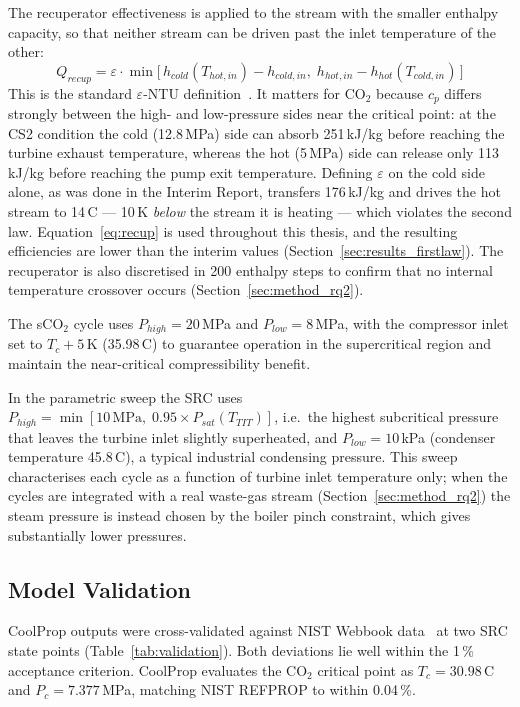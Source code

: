 \documentclass[12pt,a4paper]{report}
\begin{document}
\label{sec:method_recup}
The recuperator effectiveness is applied to the stream with the smaller
enthalpy capacity, so that neither stream can be driven past the inlet
temperature of the other:
\begin{equation}
Q_{recup} = \varepsilon \cdot \min\!\big[\,h_{cold}(T_{hot,in}) - h_{cold,in},\;
h_{hot,in} - h_{hot}(T_{cold,in})\,\big]
\label{eq:recup}
\end{equation}
This is the standard $\varepsilon$-NTU definition~\cite{Moran2018}. It
matters for CO$_2$ because $c_p$ differs strongly between the high- and
low-pressure sides near the critical point: at the CS2 condition the cold
(12.8\,MPa) side can absorb 251\,kJ/kg before reaching the turbine exhaust
temperature, whereas the hot (5\,MPa) side can release only 113\,kJ/kg before
reaching the pump exit temperature. Defining $\varepsilon$ on the cold side
alone, as was done in the Interim Report, transfers 176\,kJ/kg and drives the
hot stream to 14\,\textdegree C --- 10\,K \emph{below} the stream it is
heating --- which violates the second law. Equation~\eqref{eq:recup} is used
throughout this thesis, and the resulting efficiencies are lower than the
interim values (Section~\ref{sec:results_firstlaw}). The recuperator is also
discretised in 200 enthalpy steps to confirm that no internal temperature
crossover occurs (Section~\ref{sec:method_rq2}).

The sCO$_2$ cycle uses $P_{high} = 20$\,MPa and $P_{low} = 8$\,MPa, with
the compressor inlet set to $T_c + 5$\,K (35.98\,\textdegree C) to guarantee
operation in the supercritical region and maintain the near-critical
compressibility benefit.

In the parametric sweep the SRC uses $P_{high} = \min[10\,\text{MPa},\;
0.95 \times P_{sat}(T_{TIT})]$, i.e.\ the highest subcritical pressure that
leaves the turbine inlet slightly superheated, and $P_{low} = 10$\,kPa
(condenser temperature 45.8\,\textdegree C), a typical industrial condensing
pressure. This sweep characterises each cycle as a function of turbine inlet
temperature only; when the cycles are integrated with a real waste-gas stream
(Section~\ref{sec:method_rq2}) the steam pressure is instead chosen by the
boiler pinch constraint, which gives substantially lower pressures.

\subsection{Model Validation}

CoolProp outputs were cross-validated against NIST Webbook
data~\cite{Lemmon2018} at two SRC state points (Table~\ref{tab:validation}).
Both deviations lie well within the 1\,\% acceptance criterion. CoolProp
evaluates the CO$_2$ critical point as $T_c = 30.98$\,\textdegree C and
$P_c = 7.377$\,MPa, matching NIST REFPROP to within 0.04\,\%.
\end{document}
